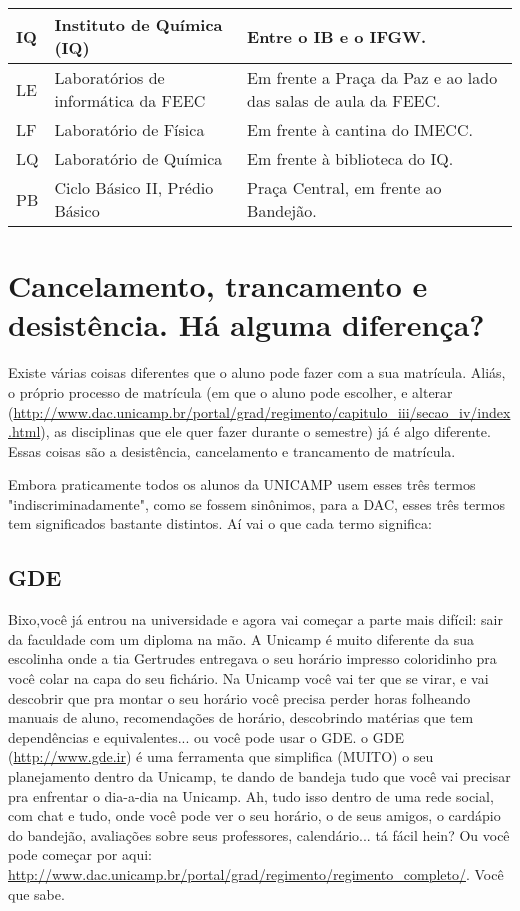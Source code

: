 \begin{tabularx}{\linewidth}{|Y|Y|Y|}
 IQ  &  Instituto de Química (IQ)  &  Entre o IB e o IFGW.\tabularnewline \hline

 LE  &  Laboratórios de informática da FEEC  &  Em frente a Praça da Paz e ao lado das salas de aula da FEEC.\tabularnewline \hline

 LF  &  Laboratório de Física  &  Em frente à cantina do IMECC.\tabularnewline \hline

 LQ  &  Laboratório de Química  &  Em frente à biblioteca do IQ.\tabularnewline \hline

 PB  &  Ciclo Básico II, Prédio Básico  &  Praça Central, em frente ao Bandejão.\tabularnewline \hline

\end{tabularx}

\section{Cancelamento, trancamento e desistência. Há alguma diferença?}
Existe várias coisas diferentes que o aluno pode fazer com a sua matrícula.
Aliás, o próprio processo de matrícula (em que o aluno pode escolher, e alterar
(\url{http://www.dac.unicamp.br/portal/grad/regimento/capitulo_iii/secao_iv/index.html}),
as disciplinas que ele quer fazer durante o semestre) já é algo diferente. Essas
coisas são a desistência, cancelamento e trancamento de matrícula.

Embora praticamente todos os alunos da UNICAMP usem esses três termos
"indiscriminadamente", como se fossem sinônimos, para a DAC, esses três termos
tem significados bastante distintos. Aí vai o que cada termo significa:

\subsection{GDE}
Bixo,você já entrou na universidade e agora vai começar a parte mais difícil:
sair da faculdade com um diploma na mão.  A Unicamp é muito diferente da sua
escolinha onde a tia Gertrudes entregava o seu horário impresso coloridinho pra
você colar na capa do seu fichário. Na Unicamp você vai ter que se virar, e vai
descobrir que pra montar o seu horário você precisa perder horas folheando
manuais de aluno, recomendações de horário, descobrindo matérias que tem
dependências e equivalentes... ou você pode usar o GDE.  o GDE
(\url{http://www.gde.ir}) é uma ferramenta que simplifica (MUITO) o seu
planejamento dentro da Unicamp, te dando de bandeja tudo que você vai precisar
pra enfrentar o dia-a-dia na Unicamp.  Ah, tudo isso dentro de uma rede social,
com chat e tudo, onde você pode ver o seu horário, o de seus amigos, o cardápio
do bandejão, avaliações sobre seus professores, calendário... tá fácil hein?  Ou
você pode começar por aqui:
\url{http://www.dac.unicamp.br/portal/grad/regimento/regimento_completo/}. Você
que sabe.

